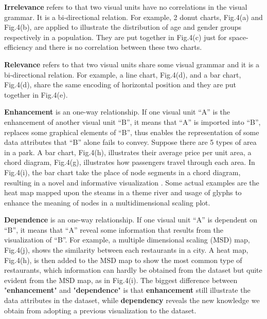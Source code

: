 \textbf{Irrelevance} refers to that two visual units have no correlations in the visual grammar. It is a bi-directional relation. For example, 2 donut charts, Fig.4(a) and Fig.4(b), are applied to illustrate the distribution of age and gender groups respectively in a population. They are put together in Fig.4(c) just for space-efficiency and there is no correlation between these two charts. 

\textbf{Relevance} refers to that two visual units share some visual grammar and it is a bi-directional relation. For example, a line chart, Fig.4(d), and a bar chart, Fig.4(d), share the same encoding of horizontal position and they are put together in Fig.4(e). 

\textbf{Enhancement} is an one-way relationship. If one visual unit ``A'' is the enhancement of another visual unit ``B'', it means that ``A'' is imported into ``B'', replaces some graphical elements of ``B'', thus enables the representation of some data attributes that ``B'' alone fails to convey. Suppose there are 5 types of area in a park. A bar chart, Fig.4(h), illustrates their average price per unit area, a chord diagram, Fig.4(g), illustrates how passengers travel through each area. In Fig.4(i), the bar chart take the place of node segments in a chord diagram, resulting in a novel and informative visualization      . Some actual examples are the heat map mapped upon the steams in a theme river\cite{wu_opinionflow:_2014}  and usage of glyphs to enhance the meaning of nodes in a multidimensional scaling plot.\cite{chen_peakvizor:_2016}

\textbf{Dependence} is an one-way relationship. If one visual unit ``A'' is dependent on ``B'', it means that ``A'' reveal some information that results from the visualization of ``B''. For example, a multiple dimensional scaling (MSD) map, Fig.4(j), shows the similarity between each restaurants in a city. A heat map, Fig.4(h), is then added to the MSD map to show the most common type of restaurants, which information can hardly be obtained from the dataset but quite evident from the MSD map, as in Fig.4(i). The biggest difference between "\textbf{enhancement}" and "\textbf{dependence}" is that \textbf{enhancement} still illustrate the data attributes in the dataset, while \textbf{dependency} reveals the new knowledge we obtain from adopting a previous visualization to the dataset. 

